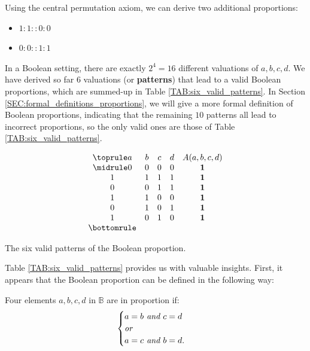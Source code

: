 Using the central permutation axiom, we can derive two additional proportions:

\begin{itemize}
  \item $1 : 1 :: 0 : 0$
  \item $0 : 0 :: 1 : 1$
\end{itemize}

In a Boolean setting, there are exactly $2^4 = 16$ different valuations of $a,
b, c, d$. We have derived so far $6$ valuations (or \textbf{patterns}) that
lead to a valid Boolean proportions, which are summed-up in Table
\ref{TAB:six_valid_patterns}. In Section
\ref{SEC:formal_definitions_proportions}, we will give a more formal definition
of Boolean proportions, indicating that the remaining $10$ patterns all lead to
incorrect proportions, so the only valid ones are those of Table
\ref{TAB:six_valid_patterns}.

\begin{table}[t]
  \centering
  $$
  \begin{array}{ccccc}
    \toprule
    a & b & c & d &  A(a, b, c, d)\\
    \midrule
    0 & 0 & 0 & 0 &   \textbf{1}\\
    1 & 1 & 1 & 1 &   \textbf{1}\\
    0 & 0 & 1 & 1 &   \textbf{1}\\
    1 & 1 & 0 & 0 &   \textbf{1}\\
    0 & 1 & 0 & 1 &   \textbf{1}\\
    1 & 0 & 1 & 0 &   \textbf{1}\\
    \bottomrule
  \end{array}
  $$
  \caption{The six valid patterns of the Boolean proportion.}
  \label{TAB:six_valid_patterns}
\end{table}

Table \ref{TAB:six_valid_patterns} provides us with valuable insights.  First,
it appears that the Boolean proportion can be defined in the following way:

\begin{definition}
  \label{DEF:boolean_proportion_informal}
  Four elements $a, b, c, d$ in $\mathbb{B}$ are in proportion if:
  $$
  \begin{cases}
    a = b \emph{ and } c = d\\
    \emph{or}\\
    a = c \emph{ and } b = d.
  \end{cases}
  $$
\end{definition}


